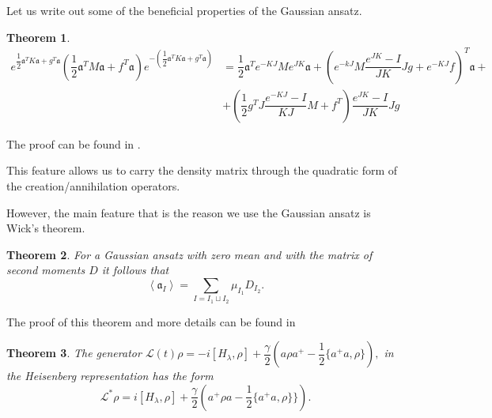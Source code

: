 \documentclass[12pt]{article}
\newtheorem{theorem}{Theorem}
\theoremstyle{definition}
\newcommand\Tr{\operatorname{Tr}}
\newcommand\bra{\left<}
\newcommand\ket{\right>}
\newcommand{\braket}[1]{\bra#1\ket}
\newcommand{\mf}[1]{\mathfrak{#1}}
\def\ga {\gamma}
\def\la {\lambda}
\begin{document}
%	
	
	Let us write out some of the beneficial properties of the Gaussian ansatz.
	
	\begin{theorem}
		\label{th:KvFor}
		\begin{align*}
			\label{eq:KvFor}
			e^{\dfrac{1}{2}\mf{a}^TK\mf{a} + g^T\mf{a}}(\dfrac{1}{2}\mf{a}^TM\mf{a} + f^T\mf{a})e^{-(\dfrac{1}{2}\mf{a}^TK\mf{a} + g^T\mf{a})} &= \dfrac{1}{2}\mf{a}^Te^{-KJ}Me^{JK}\mf{a} + \left(e^{-kJ}M\dfrac{e^{JK}-I}{JK}Jg + e^{-KJ}f\right)^T\mf{a} + \nonumber\\
			&+ \left(\dfrac{1}{2}g^TJ\dfrac{e^{-KJ}-I}{KJ}M + f^T\right)\dfrac{e^{JK} - I}{JK}Jg&
		\end{align*}
	\end{theorem}
	The proof can be found in \cite{Dis}. 
	
	This feature allows us to carry the density matrix through the quadratic form of the creation/annihilation operators.
	
	However, the main feature that is the reason we use the Gaussian ansatz is Wick's theorem.
	
	\begin{theorem}
		\label{th:IW0}
		For a Gaussian ansatz with zero mean and with the matrix of second moments $D$ it follows that 
		\begin{equation*}
			\braket{\mf{a}_I} = \sum\limits_{I = I_1 \sqcup I_2}\mu_{I_1}D_{I_2}.
		\end{equation*}
	\end{theorem}
	The proof of this theorem and more details can be found in \cite{NosalTeretenkov}
	
	
	
	
	
	\begin{theorem}
		\label{th:HeiGenerator}
		The generator $\mathcal{L}(t)\rho = -i[H_{\lambda},\rho] + \dfrac{\ga}{2}(a\rho a^+ - \dfrac12\{a^+a,\rho\}),$ in the Heisenberg representation has the form 
		\begin{equation*}
			\mathcal{L}^*\rho = i[H_{\la},\rho]  + \dfrac{\ga}{2}(a^+\rho a - \dfrac{1}{2}\{a^+a,\rho\}\}).
		\end{equation*}
	\end{theorem}
	
\end{document}

